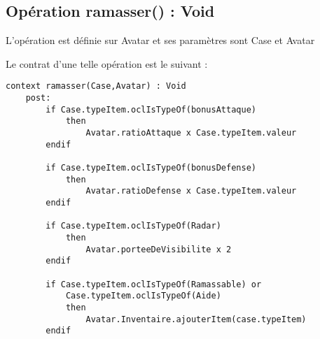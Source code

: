 
\subsection{Opération ramasser() : Void}
\label{sec:question18}

L'opération est définie sur Avatar et ses paramètres sont Case et Avatar

Le contrat d'une telle opération est le suivant :

\begin{lstlisting}[caption=Contrat \textsc{Ocl} sur l'opération ramasser,captionpos=b,label={lst:ramasser},language=OCL]
context ramasser(Case,Avatar) : Void
    post:
        if Case.typeItem.oclIsTypeOf(bonusAttaque)
            then
                Avatar.ratioAttaque x Case.typeItem.valeur
        endif

        if Case.typeItem.oclIsTypeOf(bonusDefense)
            then
                Avatar.ratioDefense x Case.typeItem.valeur
        endif

        if Case.typeItem.oclIsTypeOf(Radar)
            then
                Avatar.porteeDeVisibilite x 2
        endif

        if Case.typeItem.oclIsTypeOf(Ramassable) or
            Case.typeItem.oclIsTypeOf(Aide)
            then
                Avatar.Inventaire.ajouterItem(case.typeItem)
        endif
\end{lstlisting}
